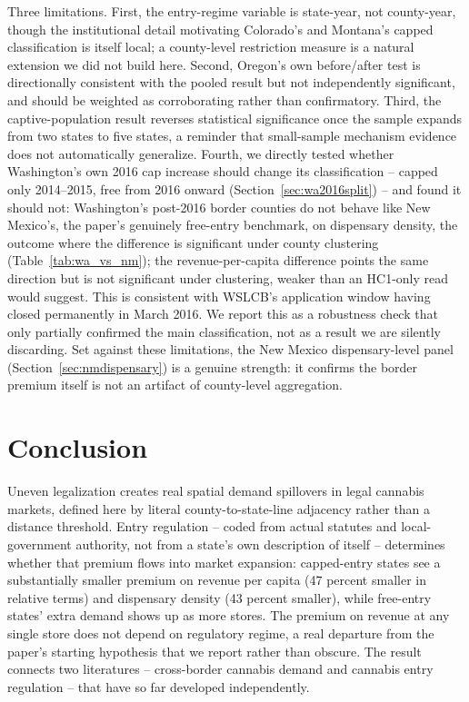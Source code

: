 \documentclass[12pt]{article}
\begin{document}
Three limitations. First, the entry-regime variable is state-year, not county-year, though the institutional
detail motivating Colorado's and Montana's capped classification is itself local; a county-level restriction
measure is a natural extension we did not build here. Second, Oregon's own before/after test is directionally
consistent with the pooled result but not independently significant, and should be weighted as corroborating
rather than confirmatory. Third, the captive-population result reverses statistical significance once the
sample expands from two states to five states, a reminder that small-sample mechanism evidence does not
automatically generalize. Fourth, we directly tested whether Washington's own 2016 cap increase should change
its classification -- capped only 2014--2015, free from 2016 onward (Section~\ref{sec:wa2016split}) -- and
found it should not: Washington's post-2016 border counties do not behave like New Mexico's, the paper's
genuinely free-entry benchmark, on dispensary density, the outcome where the difference is significant under
county clustering (Table~\ref{tab:wa_vs_nm}); the revenue-per-capita difference points the same direction but
is not significant under clustering, weaker than an HC1-only read would suggest. This is consistent with
WSLCB's application window having closed permanently in March 2016. We report this as a robustness check that
only partially confirmed the main classification, not as a result we are silently discarding.
Set against these limitations, the New Mexico dispensary-level panel (Section~\ref{sec:nmdispensary}) is a
genuine strength: it confirms the border premium itself is not an artifact of county-level aggregation.

\section{Conclusion}
\label{sec:conclusion}

Uneven legalization creates real spatial demand spillovers in legal cannabis markets, defined here by literal
county-to-state-line adjacency rather than a distance threshold. Entry regulation -- coded from actual
statutes and local-government authority, not from a state's own description of itself -- determines whether
that premium flows into market expansion: capped-entry states see a substantially smaller premium on revenue
per capita (47 percent smaller in relative terms) and dispensary density (43 percent smaller), while
free-entry states' extra demand shows up as more stores. The premium on revenue at any single store does not
depend on regulatory regime, a real departure from the paper's starting hypothesis that we report rather than
obscure. The result connects two literatures -- cross-border cannabis demand and cannabis entry regulation --
that have so far developed independently.



\end{document}
